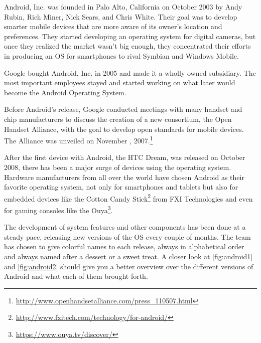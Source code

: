 Android, Inc. was founded in Palo Alto, California on October 2003 by Andy Rubin, Rich Miner, Nick Sears, and Chris White. Their goal was to develop smarter mobile devices that are more aware of its owner's location and preferences. They started developing an operating system for digital cameras, but once they realized the market wasn't big enough, they concentrated their efforts in producing an \ac{OS} for smartphones to rival Symbian and Windows Mobile.\cite{wikipedia:android}

Google bought Android, Inc. in 2005 and made it a wholly owned subsidiary. The most important employees stayed and started working on what later would become the Android Operating System.

Before Android's release, Google conducted meetings with many handset and chip manufacturers to discuss the creation of a new consortium, the Open Handset Alliance, with the goal to develop open standards for mobile devices. The Alliance was unveiled on November , 2007.\footnote{\url{http://www.openhandsetalliance.com/press_110507.html}}


After the first device with Android, the HTC Dream, was released on October 2008, there has been a major surge of devices using the operating system. Hardware manufacturers from all over the world have chosen Android as their favorite operating system, not only for smartphones and tablets but also for embedded devices like the Cotton Candy Stick\footnote{\url{http://www.fxitech.com/technology/for-android/}} from FXI Technologies and even for gaming consoles like the Ouya\footnote{\url{https://www.ouya.tv/discover/}}. %


The development of system features and other components has been done at a steady pace, releasing new versions of the \ac{OS} every couple of months. The team has chosen to give colorful names to each release, always in alphabetical order and always named after a dessert or a sweet treat. A closer look at \autoref{fig:android1} and \autoref{fig:android2} should give you a better overview over the different versions of Android and what each of them brought forth.   

